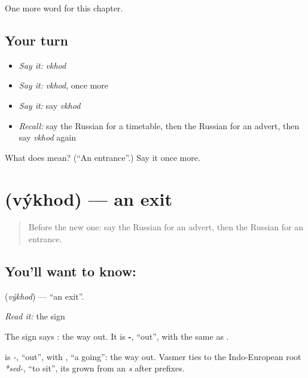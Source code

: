\begin{grammarlens}[title={What you've built}]
One more word for this chapter.
\end{grammarlens}

\subsection*{Your turn}
\begin{itemize}
\raggedright
  \item \emph{Say it:} \emph{vkhod}
  \item \emph{Say it:} \emph{vkhod}, once more
  \item \emph{Say it:} say \emph{vkhod}
  \item \emph{Recall:} say the Russian for a timetable, then the Russian for an advert, then say \emph{vkhod} again
\end{itemize}

\begin{tcolorbox}[breakable,colback=teal!4,colframe=teal!35!black,title={Before you move on}]
What does  mean? (\textquotedblleft{}An entrance\textquotedblright{}.) Say it once more.
\end{tcolorbox}
\section[\texorpdfstring{\ru{выход} (výkhod)}{выход (výkhod)}]{ (výkhod) — an exit}

\label{lesson:RU-C139-vykhod}



\begin{quote}
Before the new one: say the Russian for an advert, then the Russian for an entrance.
\end{quote}

\subsection*{You'll want to know: }
\textbf{} (\emph{výkhod}) — \textquotedblleft{}an exit\textquotedblright{}.

\emph{Read it:} the sign

The sign says \textbf{}: the way out. It is \textbf{-}, \textquotedblleft{}out\textquotedblright{}, with the same \textbf{} as \textbf{}.

\begin{cousinweb}
\textbf{} is \emph{-}, \textquotedblleft{}out\textquotedblright{}, with \emph{}, \textquotedblleft{}a going\textquotedblright{}: the way out. Vasmer ties \emph{} to the Indo-European root \emph{*sed-}, \textquotedblleft{}to sit\textquotedblright{}, its \emph{} grown from an \emph{s} after prefixes.
\end{cousinweb}

